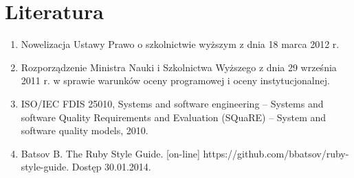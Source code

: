 \chapter{Literatura}

\begin{enumerate}
\item Nowelizacja Ustawy Prawo o szkolnictwie wyższym z dnia 18 marca 2012 r.
\item Rozporządzenie Ministra Nauki i Szkolnictwa Wyższego z dnia 29 września 2011 r. w sprawie warunków oceny programowej i oceny instytucjonalnej.
\item ISO/IEC FDIS 25010, Systems and software engineering – Systems and software Quality Requirements and Evaluation (SQuaRE) – System and software quality models, 2010.
\item Batsov B. The Ruby Style Guide. [on-line] https://github.com/bbatsov/ruby-style-guide. Dostęp 30.01.2014.
\end{enumerate}

